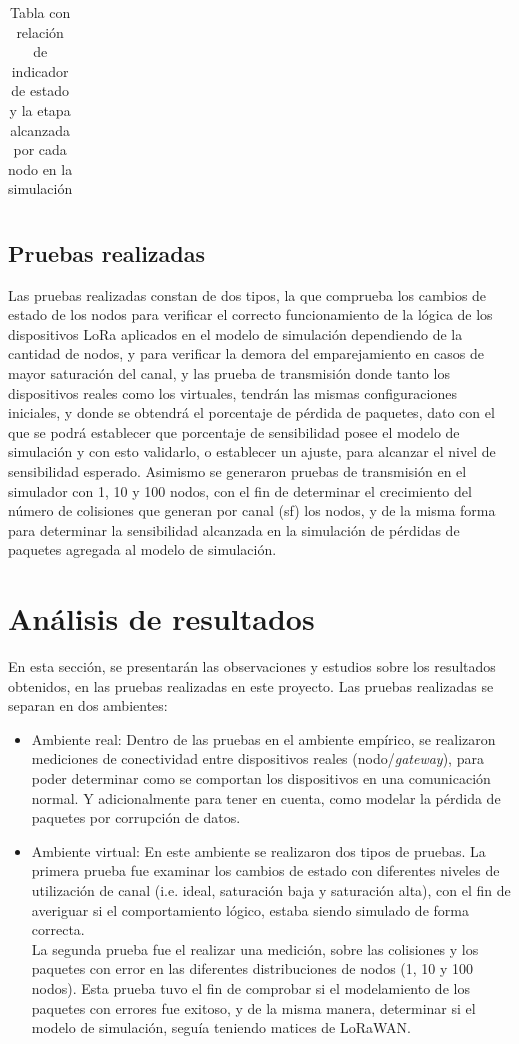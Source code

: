 \begin{justify}
\begin{table}[!ht]
\begin{tabular}{|c|c|c|}
\end{tabular}
\caption{Tabla con relación de indicador de estado y la etapa alcanzada por cada nodo en la simulación}
\label{tab:estados}
\end{table}

\subsection{Pruebas realizadas}
Las pruebas realizadas constan de dos tipos, la que comprueba los cambios de estado de los nodos para verificar el correcto funcionamiento de la lógica de los dispositivos LoRa aplicados en el modelo de simulación dependiendo de la cantidad de nodos, y para verificar la demora del emparejamiento en casos de mayor saturación del canal, y las prueba de transmisión donde tanto los dispositivos reales como los virtuales, tendrán las mismas configuraciones iniciales, y donde se obtendrá el porcentaje de pérdida de paquetes, dato con el que se podrá establecer que porcentaje de sensibilidad posee el modelo de simulación y con esto validarlo, o establecer un ajuste, para alcanzar el nivel de sensibilidad esperado. Asimismo se generaron pruebas de transmisión en el simulador con 1, 10 y 100 nodos, con el fin de determinar el crecimiento del número de colisiones que generan por canal (\gls{sf}) los nodos, y de la misma forma para determinar la sensibilidad alcanzada en la simulación de pérdidas de paquetes agregada al modelo de simulación.

\section{Análisis de resultados}
En esta sección, se presentarán las observaciones y estudios sobre los resultados obtenidos, en las pruebas realizadas en este proyecto. Las pruebas realizadas se separan en dos ambientes:
\begin{itemize}
\item Ambiente real: Dentro de las pruebas en el ambiente empírico, se realizaron mediciones de conectividad entre dispositivos reales (nodo/\textit{gateway}), para poder determinar como se comportan los dispositivos en una comunicación normal. Y adicionalmente para tener en cuenta, como modelar la pérdida de paquetes por corrupción de datos.
\item Ambiente virtual: En este ambiente se realizaron dos tipos de pruebas. La primera prueba fue examinar los cambios de estado con diferentes niveles de utilización de canal (i.e. ideal, saturación baja y saturación alta), con el fin de averiguar si el comportamiento lógico, estaba siendo simulado de forma correcta.\\
La segunda prueba fue el realizar una medición, sobre las colisiones y los paquetes con error en las diferentes distribuciones de nodos (1, 10 y 100 nodos). Esta prueba tuvo el fin de comprobar si el modelamiento de los paquetes con errores fue exitoso, y de la misma manera, determinar si el modelo de simulación, seguía teniendo matices de LoRaWAN. 
\end{itemize}


\end{justify}

